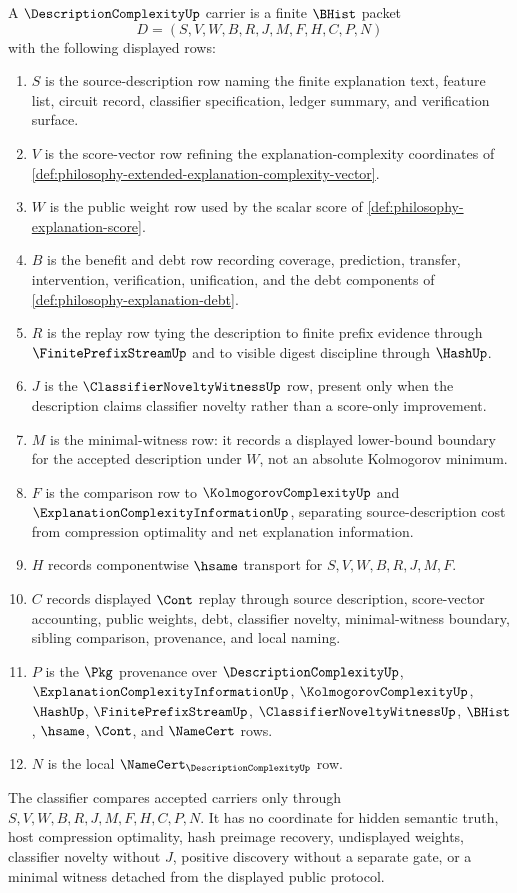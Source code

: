 \begin{definition}
\label{def:description-complexity-carrier}
A $\DescriptionComplexityUp$ carrier is a finite $\BHist$ packet
$$
D=(S,V,W,B,R,J,M,F,H,C,P,N)
$$
with the following displayed rows:
\begin{enumerate}
\item $S$ is the source-description row naming the finite explanation text, feature list, circuit record, classifier specification, ledger summary, and verification surface.
\item $V$ is the score-vector row refining the explanation-complexity coordinates of \autoref{def:philosophy-extended-explanation-complexity-vector}.
\item $W$ is the public weight row used by the scalar score of \autoref{def:philosophy-explanation-score}.
\item $B$ is the benefit and debt row recording coverage, prediction, transfer, intervention, verification, unification, and the debt components of \autoref{def:philosophy-explanation-debt}.
\item $R$ is the replay row tying the description to finite prefix evidence through $\FinitePrefixStreamUp$ and to visible digest discipline through $\HashUp$.
\item $J$ is the $\ClassifierNoveltyWitnessUp$ row, present only when the description claims classifier novelty rather than a score-only improvement.
\item $M$ is the minimal-witness row: it records a displayed lower-bound boundary for the accepted description under $W$, not an absolute Kolmogorov minimum.
\item $F$ is the comparison row to $\KolmogorovComplexityUp$ and $\ExplanationComplexityInformationUp$, separating source-description cost from compression optimality and net explanation information.
\item $H$ records componentwise $\hsame$ transport for $S,V,W,B,R,J,M,F$.
\item $C$ records displayed $\Cont$ replay through source description, score-vector accounting, public weights, debt, classifier novelty, minimal-witness boundary, sibling comparison, provenance, and local naming.
\item $P$ is the $\Pkg$ provenance over $\DescriptionComplexityUp$, $\ExplanationComplexityInformationUp$, $\KolmogorovComplexityUp$, $\HashUp$, $\FinitePrefixStreamUp$, $\ClassifierNoveltyWitnessUp$, $\BHist$, $\hsame$, $\Cont$, and $\NameCert$ rows.
\item $N$ is the local $\NameCert_{\DescriptionComplexityUp}$ row.
\end{enumerate}
The classifier compares accepted carriers only through $S,V,W,B,R,J,M,F,H,C,P,N$. It has no coordinate for hidden semantic truth, host compression optimality, hash preimage recovery, undisplayed weights, classifier novelty without $J$, positive discovery without a separate gate, or a minimal witness detached from the displayed public protocol.
\end{definition}

